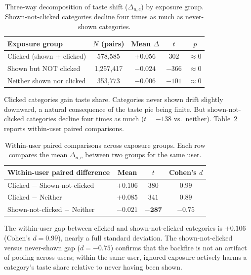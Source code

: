 \documentclass[11pt]{article}
\begin{document}
\begin{table}[ht]
\centering
\caption{Three-way decomposition of taste shift ($\Delta_{u,c}$) by exposure group. Shown-not-clicked categories decline four times as much as never-shown categories.}
\label{tab:threeway}
\begin{tabular}{lcccc}
\toprule
Exposure group & $N$ (pairs) & Mean $\Delta$ & $t$ & $p$ \\
\midrule
Clicked (shown + clicked) & 578,585 & $+0.056$ & $302$ & $\approx 0$ \\
Shown but NOT clicked & 1,257,417 & $-0.024$ & $-366$ & $\approx 0$ \\
Neither shown nor clicked & 353,773 & $-0.006$ & $-101$ & $\approx 0$ \\
\bottomrule
\end{tabular}
\end{table}
\FloatBarrier

Clicked categories gain taste share. Categories never shown drift slightly downward, a natural consequence of the taste pie being finite. But shown-not-clicked categories decline four times as much ($t = -138$ vs.\ neither). Table~\ref{tab:paired} reports within-user paired comparisons.

\begin{table}[ht]
\centering
\caption{Within-user paired comparisons across exposure groups. Each row compares the mean $\Delta_{u,c}$ between two groups for the same user.}
\label{tab:paired}
\begin{tabular}{lccc}
\toprule
Within-user paired difference & Mean & $t$ & Cohen's $d$ \\
\midrule
Clicked $-$ Shown-not-clicked & $+0.106$ & $380$ & $0.99$ \\
Clicked $-$ Neither & $+0.085$ & $341$ & $0.89$ \\
Shown-not-clicked $-$ Neither & $\mathbf{-0.021}$ & $\mathbf{-287}$ & $\mathbf{-0.75}$ \\
\bottomrule
\end{tabular}
\end{table}
\FloatBarrier

The within-user gap between clicked and shown-not-clicked categories is $+0.106$ (Cohen's $d = 0.99$), nearly a full standard deviation. The shown-not-clicked versus never-shown gap ($d = -0.75$) confirms that the backfire is not an artifact of pooling across users; within the same user, ignored exposure actively harms a category's taste share relative to never having been shown.
\end{document}
